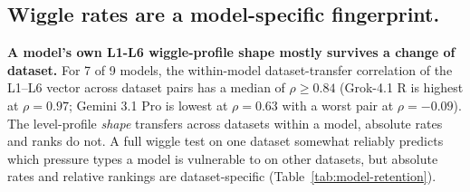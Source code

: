 \subsection{Wiggle rates are a model-specific fingerprint.}
\label{fo:fingerprint}

\textbf{A model's own L1-L6 wiggle-profile shape mostly survives a change of dataset.} 
For 7 of 9 models, the within-model dataset-transfer correlation of the L1--L6 vector
across dataset pairs has a median of $\rho \geq 0.84$ 
(Grok-4.1 R is highest at $\rho = 0.97$; Gemini 3.1 Pro is lowest at $\rho = 0.63$ with a worst pair at $\rho = -0.09$).
The level-profile \emph{shape} transfers across datasets within a model, 
absolute rates and ranks do not. A full wiggle test on one dataset somewhat reliably predicts which pressure types a model is vulnerable to on other datasets,
but absolute rates and relative rankings are dataset-specific (Table~\ref{tab:model-retention}).

